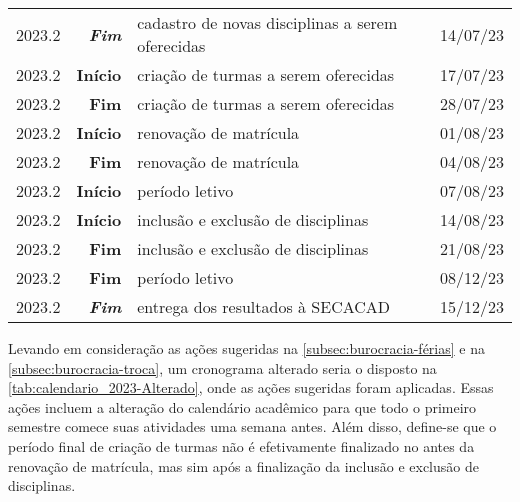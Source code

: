 \begin{table}[H]
\begin{tabular}{| c r l c |}
    2023.2            & \textbf{\textit{Fim}} & cadastro de novas disciplinas a serem oferecidas & 14/07/23      \\
    2023.2            & \textbf{Início}       & criação de turmas a serem oferecidas             & 17/07/23      \\
    2023.2            & \textbf{Fim}          & criação de turmas a serem oferecidas             & 28/07/23      \\
    2023.2            & \textbf{Início}       & renovação de matrícula                           & 01/08/23      \\
    2023.2            & \textbf{Fim}          & renovação de matrícula                           & 04/08/23      \\
    2023.2            & \textbf{Início}       & período letivo                                   & 07/08/23      \\
    2023.2            & \textbf{Início}       & inclusão e exclusão de disciplinas               & 14/08/23      \\
    2023.2            & \textbf{Fim}          & inclusão e exclusão de disciplinas               & 21/08/23      \\
    2023.2            & \textbf{Fim}          & período letivo                                   & 08/12/23      \\
    2023.2            & \textbf{\textit{Fim}} & entrega dos resultados à SECACAD                 & 15/12/23      \\

    \hline
  \end{tabular}
\end{table}

Levando em consideração as ações sugeridas na \autoref{subsec:burocracia-férias} e na \autoref{subsec:burocracia-troca}, um cronograma alterado seria o disposto na \autoref{tab:calendario_2023-Alterado}, onde as ações sugeridas foram aplicadas. Essas ações incluem a alteração do calendário acadêmico para que todo o primeiro semestre comece suas atividades uma semana antes. Além disso, define-se que o período final de criação de turmas não é efetivamente finalizado no antes da renovação de matrícula, mas sim após a finalização da inclusão e exclusão de disciplinas.

